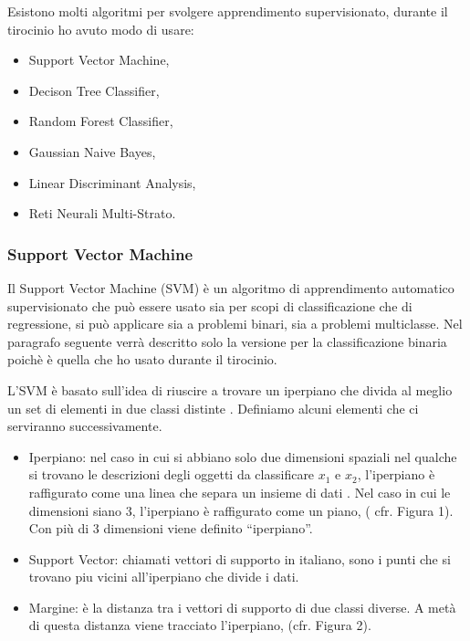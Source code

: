 \documentclass[12pt,italian]{report}
\begin{document}
Esistono molti algoritmi per svolgere apprendimento supervisionato, durante il tirocinio ho avuto modo di usare:
\begin{itemize}
	\item Support Vector Machine,
	\item Decison Tree Classifier,
	\item Random Forest Classifier,
	\item Gaussian Naive Bayes,
	\item Linear Discriminant Analysis,
	\item Reti Neurali Multi-Strato.
\end{itemize}

\subsubsection{Support Vector Machine}
\label{sec:SVC}
Il Support Vector Machine (SVM) è un algoritmo di apprendimento automatico supervisionato che può essere usato sia per scopi di classificazione che di regressione, si può applicare sia a problemi binari, sia a problemi multiclasse. Nel paragrafo seguente verrà descritto solo la versione per la classificazione binaria poichè è quella che ho usato durante il tirocinio.

L'SVM è basato sull'idea di riuscire a trovare un iperpiano che divida al meglio un set di elementi in due classi distinte \cite{LectureNotesNg}. Definiamo alcuni elementi che ci serviranno successivamente.


\begin{itemize}
	\item Iperpiano: nel caso in cui si abbiano solo due dimensioni spaziali nel qualche si trovano le descrizioni degli oggetti da classificare $x_1$ e $x_2$, l'iperpiano è raffigurato come una linea che separa un insieme di dati \cite{LectureNotesNg}. Nel caso in cui le dimensioni siano 3, l'iperpiano è raffigurato come un piano, ( cfr. Figura 1).
	Con più di 3 dimensioni viene definito ``iperpiano''.
	\item Support Vector: chiamati vettori di supporto in italiano, sono i punti che si trovano piu vicini all'iperpiano che divide i dati.
	\item Margine: è la distanza tra i vettori di supporto di due classi diverse. A metà di questa distanza viene tracciato l'iperpiano, (cfr. Figura 2).
\end{itemize}
\end{document}
